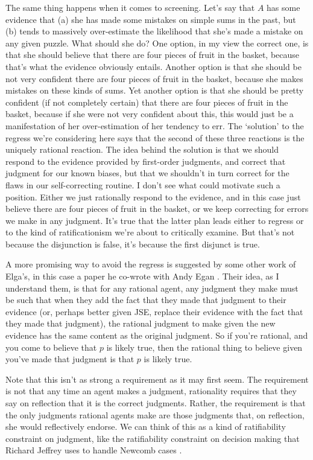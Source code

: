 The same thing happens when it comes to screening. Let's say that \(A\) has some evidence that (a) she has made some mistakes on simple sums in the past, but (b) tends to massively over-estimate the likelihood that she's made a mistake on any given puzzle. What should she do? One option, in my view the correct one, is that she should believe that there are four pieces of fruit in the basket, because that's what the evidence obviously entails. Another option is that she should be not very confident there are four pieces of fruit in the basket, because she makes mistakes on these kinds of sums. Yet another option is that she should be pretty confident (if not completely certain) that there are four pieces of fruit in the basket, because if she were not very confident about this, this would just be a manifestation of her over-estimation of her tendency to err. The `solution' to the regress we're considering here says that the second of these three reactions is the uniquely rational reaction. The idea behind the solution is that we should respond to the evidence provided by first-order judgments, and correct that judgment for our known biases, but that we shouldn't in turn correct for the flaws in our self-correcting routine. I don't see what could motivate such a position. Either we just rationally respond to the evidence, and in this case just believe there are four pieces of fruit in the basket, or we keep correcting for errors we make in any judgment. It's true that the latter plan leads either to regress or to the kind of ratificationism we're about to critically examine. But that's not because the disjunction is false, it's because the first disjunct is true.

A more promising way to avoid the regress is suggested by some other work of Elga's, in this case a paper he co-wrote with Andy Egan \citep{Egan2005-EGAICB}. Their idea, as I understand them, is that for any rational agent, any judgment they make must be such that when they add the fact that they made that judgment to their evidence (or, perhaps better given JSE, replace their evidence with the fact that they made that judgment), the rational judgment to make given the new evidence has the same content as the original judgment. So if you're rational, and you come to believe that \(p\) is likely true, then the rational thing to believe given you've made that judgment is that \(p\) is likely true.

Note that this isn't as strong a requirement as it may first seem. The requirement is not that any time an agent makes a judgment, rationality requires that they say on reflection that it is the correct judgments. Rather, the requirement is that the only judgments rational agents make are those judgments that, on reflection, she would reflectively endorse. We can think of this as a kind of ratifiability constraint on judgment, like the ratifiability constraint on decision making that Richard Jeffrey uses to handle Newcomb cases \citet{JeffreyLogicOfDecision}.

